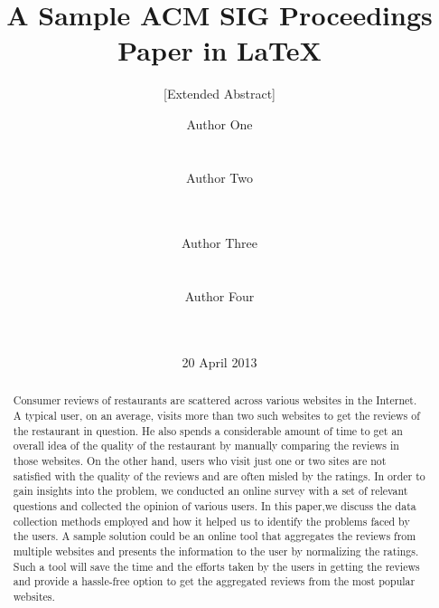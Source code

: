 \documentclass{acm_proc_article-sp}
\begin{document}
\title{A Sample {\ttlit ACM} SIG Proceedings Paper in LaTeX}
\subtitle{[Extended Abstract]}

\author{
\alignauthor
Author One\\
       \\
       \\
\alignauthor
Author Two\\
       \\
       \\
\and %
\alignauthor
Author Three\\
       \\
       \\
\alignauthor
Author Four\\
       \\
       \\
}

\date{20 April 2013}


\maketitle
\begin{abstract}
Consumer reviews of restaurants are scattered across various websites in the Internet. A typical user, on an average, visits more than two such websites to get the reviews of the restaurant in question. He also spends a considerable amount of time to get an overall idea of the quality of the restaurant by manually comparing the reviews in those websites. On the other hand, users who visit just one or two sites are not satisfied with the quality of the reviews and are often misled by the ratings. In order to gain insights into the problem, we conducted an online survey with a set of relevant questions and collected the opinion of various users. In this paper,we discuss the data collection methods employed and how it helped us to identify the problems faced by the users. A sample solution could be an online tool that aggregates the reviews from multiple websites and presents the information to the user by normalizing the ratings. Such a tool will save the time and the efforts taken by the users in getting the reviews and provide a hassle-free option to get the aggregated reviews from the most popular websites.

\end{abstract}
\end{document}
